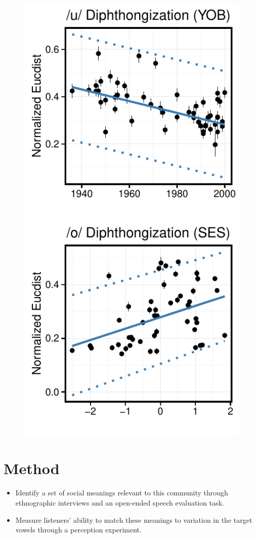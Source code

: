 \documentclass[a0,portrait]{a0poster}
\begin{document}
\begin{multicols}{4}
\begin{figure}[H]
\includegraphics[scale=1.65]{u_dip_yob.pdf}\includegraphics[scale=1.65]{o_dip_soc.pdf}
\end{figure}
\columnbreak
\section*{Method}
\begin{itemize}
\item{Identify a set of social meanings relevant to this community through ethnographic interviews and an open-ended speech evaluation task.}
\item{Measure listeners' ability to match these meanings to variation in the target vowels through a perception experiment.}
\end{itemize}


\end{multicols}
\end{document}
